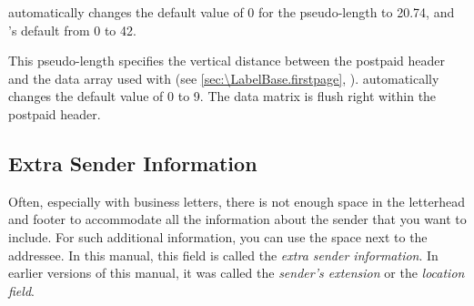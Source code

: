 \KOMAScript{} automatically changes the default value of
0 for the  pseudo-length to 20.74, and
's default from 0 to 42.%
%
\EndIndexGroup


\begin{Declaration}
\end{Declaration}
This pseudo-length specifies the vertical
distance between the postpaid header and the data array used with
%
%
 (see \autoref{sec:\LabelBase.firstpage},
). \KOMAScript{}
automatically changes the default value of 0 to 9. The data
matrix is flush right within the postpaid header.%
\EndIndexGroup
%
\EndIndexGroup


\subsection{Extra Sender Information}
\BeginIndexGroup
{}

Often, especially with business letters, there is not enough space in the
letterhead and footer to accommodate all the information about the sender that
you want to include. For such additional information, you can use the space
next to the addressee. In this manual, this field is called the
\emph{extra sender information}. In earlier versions of this manual, it
was called the \emph{sender's extension} or the \emph{location field}.


